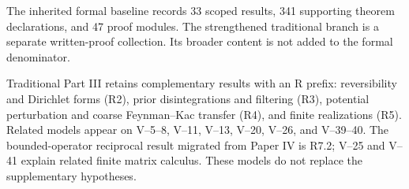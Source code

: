 The inherited formal baseline records 33 scoped results, 341 supporting theorem declarations, and 47 proof modules. The strengthened traditional branch is a separate written-proof collection. Its broader content is not added to the formal denominator.

Traditional Part III retains complementary results with an R prefix: reversibility and Dirichlet forms (R2), prior disintegrations and filtering (R3), potential perturbation and coarse Feynman--Kac transfer (R4), and finite realizations (R5). Related models appear on V--5--8, V--11, V--13, V--20, V--26, and V--39--40. The bounded-operator reciprocal result migrated from Paper IV is R7.2; V--25 and V--41 explain related finite matrix calculus. These models do not replace the supplementary hypotheses.
